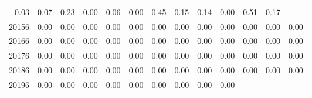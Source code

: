 \begin{table}[!h]
\begin{tabular}{lllllllllllll}
  \multicolumn{1}{|r}{0.03} &
  \multicolumn{1}{r}{0.07} &
  \multicolumn{1}{r}{0.23} &
  \multicolumn{1}{r}{0.00} &
  \multicolumn{1}{r}{0.06} &
  \multicolumn{1}{r}{0.00} &
  \multicolumn{1}{r}{0.45} &
  \multicolumn{1}{r}{0.15} &
  \multicolumn{1}{r}{0.14} &
  \multicolumn{1}{r}{0.00} &
  \multicolumn{1}{r}{0.51} &
  \multicolumn{1}{r}{0.17} \\
\multicolumn{1}{l}{\hspace{1em}20156} &
  \multicolumn{1}{|r}{0.00} &
  \multicolumn{1}{r}{0.00} &
  \multicolumn{1}{r}{0.00} &
  \multicolumn{1}{r}{0.00} &
  \multicolumn{1}{r}{0.00} &
  \multicolumn{1}{r}{0.00} &
  \multicolumn{1}{r}{0.00} &
  \multicolumn{1}{r}{0.00} &
  \multicolumn{1}{r}{0.00} &
  \multicolumn{1}{r}{0.00} &
  \multicolumn{1}{r}{0.00} &
  \multicolumn{1}{r}{0.00} \\
\multicolumn{1}{l}{\hspace{1em}20166} &
  \multicolumn{1}{|r}{0.00} &
  \multicolumn{1}{r}{0.00} &
  \multicolumn{1}{r}{0.00} &
  \multicolumn{1}{r}{0.00} &
  \multicolumn{1}{r}{0.00} &
  \multicolumn{1}{r}{0.00} &
  \multicolumn{1}{r}{0.00} &
  \multicolumn{1}{r}{0.00} &
  \multicolumn{1}{r}{0.00} &
  \multicolumn{1}{r}{0.00} &
  \multicolumn{1}{r}{0.00} &
  \multicolumn{1}{r}{0.00} \\
\multicolumn{1}{l}{\hspace{1em}20176} &
  \multicolumn{1}{|r}{0.00} &
  \multicolumn{1}{r}{0.00} &
  \multicolumn{1}{r}{0.00} &
  \multicolumn{1}{r}{0.00} &
  \multicolumn{1}{r}{0.00} &
  \multicolumn{1}{r}{0.00} &
  \multicolumn{1}{r}{0.00} &
  \multicolumn{1}{r}{0.00} &
  \multicolumn{1}{r}{0.00} &
  \multicolumn{1}{r}{0.00} &
  \multicolumn{1}{r}{0.00} &
  \multicolumn{1}{r}{0.00} \\
\multicolumn{1}{l}{\hspace{1em}20186} &
  \multicolumn{1}{|r}{0.00} &
  \multicolumn{1}{r}{0.00} &
  \multicolumn{1}{r}{0.00} &
  \multicolumn{1}{r}{0.00} &
  \multicolumn{1}{r}{0.00} &
  \multicolumn{1}{r}{0.00} &
  \multicolumn{1}{r}{0.00} &
  \multicolumn{1}{r}{0.00} &
  \multicolumn{1}{r}{0.00} &
  \multicolumn{1}{r}{0.00} &
  \multicolumn{1}{r}{0.00} &
  \multicolumn{1}{r}{0.00} \\
\multicolumn{1}{l}{\hspace{1em}20196} &
  \multicolumn{1}{|r}{0.00} &
  \multicolumn{1}{r}{0.00} &
  \multicolumn{1}{r}{0.00} &
  \multicolumn{1}{r}{0.00} &
  \multicolumn{1}{r}{0.00} &
  \multicolumn{1}{r}{0.00} &
  \multicolumn{1}{r}{0.00} &
  \multicolumn{1}{r}{0.00} &
  \multicolumn{1}{r}{0.00} &

\end{tabular}
\end{table}
